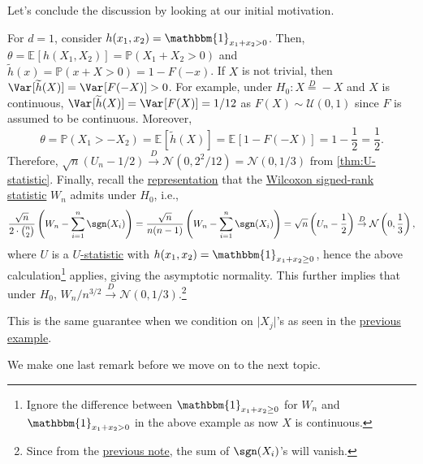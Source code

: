 Let's conclude the discussion by looking at our initial motivation.

\begin{eg}\label{eg:Wilcoxon-signed-rank-statistic-asymptotic-normality}
	For \(d = 1\), consider \(h(x_1, x_2) = \mathbbm{1}_{x_1 + x_2 > 0} \). Then, \(\theta = \mathbb{E}_{}[h(X_1, X_2)] = \mathbb{P} (X_1 + X_2 > 0)\) and \(\widetilde{h} (x) = \mathbb{P} (x + X > 0) = 1 - F(-x)\). If \(X\) is not trivial, then \(\Var_{}[\widetilde{h} (X)] = \Var_{}[F(-X)] > 0\). For example, under \(H_0 \colon X \overset{D}{=} -X \) and \(X\) is continuous, \(\Var_{}[\widetilde{h} (X)] = \Var_{}[F(X)] = 1 / 12\) as \(F(X) \sim \mathcal{U} (0, 1)\) since \(F\) is assumed to be continuous. Moreover,
	\[
		\theta
		= \mathbb{P} (X_1 > -X_2)
		= \mathbb{E}_{}[\widetilde{h} (X)]
		= \mathbb{E}_{}[1 - F(-X)]
		= 1 - \frac{1}{2}
		= \frac{1}{2}.
	\]
	Therefore, \(\sqrt{n} ( U_n - 1 / 2 ) \overset{D}{\to} \mathcal{N} ( 0, 2^2 / 12 ) = \mathcal{N} ( 0, 1 / 3 ) \) from \autoref{thm:U-statistic}. Finally, recall the \hyperref[eq:Wilcoxon-signed-rank-test]{representation} that the \hyperref[def:Wilcoxon-signed-rank-statistic]{Wilcoxon signed-rank statistic} \(W_n\) admits under \(H_0\), i.e.,
	\[
		\frac{\sqrt{n}}{2 \cdot \binom{n}{2}}  \left( W_n - \sum_{i=1}^{n} \sgn (X_i) \right)
		= \frac{\sqrt{n}}{n(n-1)} \left( W_n - \sum_{i=1}^{n} \sgn (X_i) \right)
		= \sqrt{n} \left( U_n - \frac{1}{2} \right)
		\overset{D}{\to} \mathcal{N} \left( 0, \frac{1}{3} \right),
	\]
	where \(U\) is a \hyperref[def:U-statistic]{\(U\)-statistic} with \(h(x_1, x_2) = \mathbbm{1}_{x_1 + x_2 \geq 0} \), hence the above calculation\footnote{Ignore the difference between \(\mathbbm{1}_{x_1 + x_2 \geq 0} \) for \(W_n\) and \(\mathbbm{1}_{x_1 + x_2 > 0} \) in the above example as now \(X\) is continuous.} applies, giving the asymptotic normality. This further implies that under \(H_0\), \(W_n / n^{3 / 2} \overset{D}{\to} \mathcal{N} (0, 1 / 3)\).\footnote{Since from the \hyperref[not:Wilcoxon-signed-rank-test-alone]{previous note}, the sum of \(\sgn (X_i)\)'s will vanish.}
\end{eg}

\begin{note}
	This is the same guarantee when we condition on \(\lvert X_j \rvert \)'s as seen in the \hyperref[eg:Wilcoxon-signed-rank-statistic-two-sample-probelm]{previous example}.
\end{note}

We make one last remark before we move on to the next topic.

